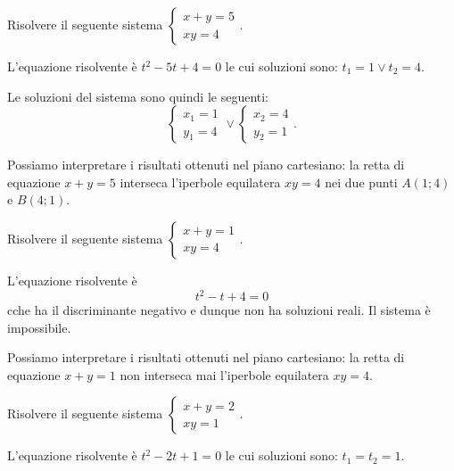 \begin{exrig}
\begin{esempio}
Risolvere il seguente sistema $\left\{\begin{array}{l}{x+y=5}\\{xy=4}\end{array}\right.$.
\begin{multicols}{2}
L'equazione risolvente è $t^2-5t+4=0$ le cui soluzioni sono: $t_1=1\vee t_2=4$.

Le soluzioni del sistema sono quindi le seguenti: \[ \left\{\begin{array}{l}{x_1=1}\\{y_1=4}\end{array}\right.\vee \left\{\begin{array}{l}{x_2=4}\\{y_2=1}\end{array}\right.. \]

Possiamo interpretare i risultati ottenuti nel piano cartesiano: la retta di equazione $x+y=5$ interseca l'iperbole equilatera ${xy}=4$ nei due punti $A(1;4)$ e $B(4;1)$.
\begin{center}

\end{center}
\end{multicols}
\end{esempio}

\begin{esempio}
Risolvere il seguente sistema $\left\{\begin{array}{l}{x+y=1}\\{xy=4}\end{array}\right.$.
\begin{multicols}{2}
L'equazione risolvente è \[ t^2-t+4=0 \] cche ha il discriminante negativo e dunque non ha soluzioni reali. Il sistema è impossibile.

Possiamo interpretare i risultati ottenuti nel piano cartesiano: la retta di equazione $x+y=1$ non interseca mai l'iperbole equilatera ${xy}=4$.
\begin{center}

\end{center}
\end{multicols}
\end{esempio}
\begin{esempio}
Risolvere il seguente sistema $\left\{\begin{array}{l}{x+y=2}\\{xy=1}\end{array}\right.$.
\begin{multicols}{2}
L'equazione risolvente è $t^2-2t+1=0$ le cui soluzioni sono: $t_1=t_2=1$.


\end{multicols}
\end{esempio}
\end{exrig}
